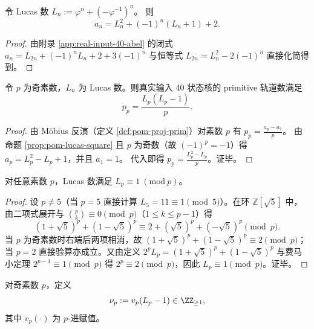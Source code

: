 \begin{proposition}\label{prop:pom-lucas-square}
令 Lucas 数
\(
L_n:=\varphi^n+(-\varphi^{-1})^n
\)。
则
\[
a_n=L_n^2+(-1)^n(L_n+1)+2.
\]
\end{proposition}
\begin{proof}
由附录 \ref{app:real-input-40-abel} 的闭式
\(
a_n=L_{2n}+(-1)^nL_n+2+3(-1)^n
\)
与恒等式 $L_{2n}=L_n^2-2(-1)^n$ 直接化简得到。
\end{proof}

\begin{proposition}\label{prop:pom-primitive-prime-lucas}
令 \(p\) 为奇素数，\(L_n\) 为 Lucas 数。则真实输入 40 状态核的 primitive 轨道数满足
$$
p_p=\frac{L_p(L_p-1)}{p}.
$$
\end{proposition}
\begin{proof}
由 Möbius 反演（定义 \ref{def:pom-proj-prim}）对素数 \(p\) 有
\(
p_p=\frac{a_p-a_1}{p}
\)。
由命题 \ref{prop:pom-lucas-square} 且 \(p\) 为奇数（故 \((-1)^p=-1\)）得
\(
a_p=L_p^2-L_p+1
\)，并且 \(a_1=1\)。
代入即得 \(p_p=\frac{L_p^2-L_p}{p}\)。证毕。
\end{proof}

\begin{lemma}[Lucas 素数同余：\texorpdfstring{$L_p\equiv 1\pmod p$}{Lp=1 mod p}]\label{lem:pom-lucas-modp}
对任意素数 \(p\)，Lucas 数满足 \(L_p\equiv 1\ (\mathrm{mod}\ p)\)。
\end{lemma}
\begin{proof}
设 \(p\neq 5\)（当 \(p=5\) 直接计算 \(L_5=11\equiv 1\pmod 5\)）。在环 \(\mathbb{Z}[\sqrt5]\) 中，
由二项式展开与 \(\binom{p}{k}\equiv 0\pmod p\)（\(1\le k\le p-1\)）得
$$
(1+\sqrt5)^p+(1-\sqrt5)^p\equiv 2+(\sqrt5)^p+(-\sqrt5)^p\pmod p.
$$
当 \(p\) 为奇素数时右端后两项相消，故
\(
(1+\sqrt5)^p+(1-\sqrt5)^p\equiv 2\pmod p
\)；
当 \(p=2\) 直接验算亦成立。又由定义 \(2^p L_p=(1+\sqrt5)^p+(1-\sqrt5)^p\) 与费马小定理 \(2^{p-1}\equiv 1\pmod p\) 得
\(
2^p\equiv 2\pmod p
\)，因此 \(L_p\equiv 1\pmod p\)。证毕。
\end{proof}

\begin{definition}\label{def:pom-lucas-nu-p}
对奇素数 \(p\)，定义
\[
\nu_p:=v_p(L_p-1)\in\ZZ_{\ge 1},
\]
其中 \(v_p(\cdot)\) 为 \(p\)-进赋值。
\end{definition}

